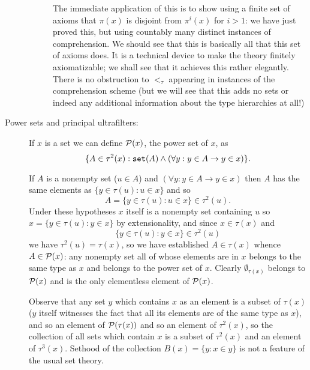 \documentclass[12pt]{article}
\begin{document}
\begin{description}
\begin{description}
\begin{enumerate}
\end{enumerate}

The immediate application of this is to show using a finite set of axioms that $\pi(x)$ is disjoint from $\pi^i(x)$ for $i>1$:  we have just proved this, but using countably many distinct instances of comprehension.  We should see that this is basically all that this set of axioms does.  It is a technical device to make the theory finitely axiomatizable;  we shall see that it achieves this rather elegantly. There is no obstruction to $<_\tau$ appearing in instances of the comprehension scheme (but we will see that this adds no sets or indeed any additional information about the type hierarchies at all!)


\end{description}

\item[Power sets and principal ultrafilters:]    If $x$ is a set we can define ${\cal P}(x)$, the power set of $x$, as $$\{A \in \tau^2(x):{\tt set}(A) \wedge (\forall y:y \in A \rightarrow y \in x)\}.$$  

If $A$ is a nonempty set ($u \in A$) and $(\forall y:y \in A \rightarrow y \in x)$ then $A$ has the same elements as
$\{y \in \tau(u):u \in x\}$ and so $$A = \{y \in \tau(u):u \in x\} \in \tau^2(u).$$ Under these hypotheses $x$ itself is a nonempty
set containing $u$ so $x = \{y \in \tau(u):y \in x\}$ by extensionality, and since $x \in \tau(x)$ and  $$\{y \in \tau(u):y \in x\}\in \tau^2(u)$$ we have $\tau^2(u)=\tau(x)$, so we have established $A \in \tau(x)$ whence $A \in {\cal P}(x)$:  any nonempty set all of whose elements are in $x$ belongs to the same type as $x$ and belongs to the power set of $x$.
Clearly $\emptyset_{\tau(x)}$ belongs to ${\cal P}(x)$ and is the only elementless element of ${\cal P}(x)$.

Observe that any set $y$ which contains $x$ as an element  is a subset of $\tau(x)$ ($y$ itself witnesses the fact that all its elements
are of the same type as $x$), and so an element of ${\cal P}(\tau(x))$ and so an element of $\tau^2(x)$, so the collection of all sets which contain $x$ is a subset of $\tau^2(x)$ and an element of $\tau^3(x)$.  Sethood of the collection $B(x) = \{y:x \in y\}$ is not a feature of the usual set theory.


\end{description}
\end{document}
